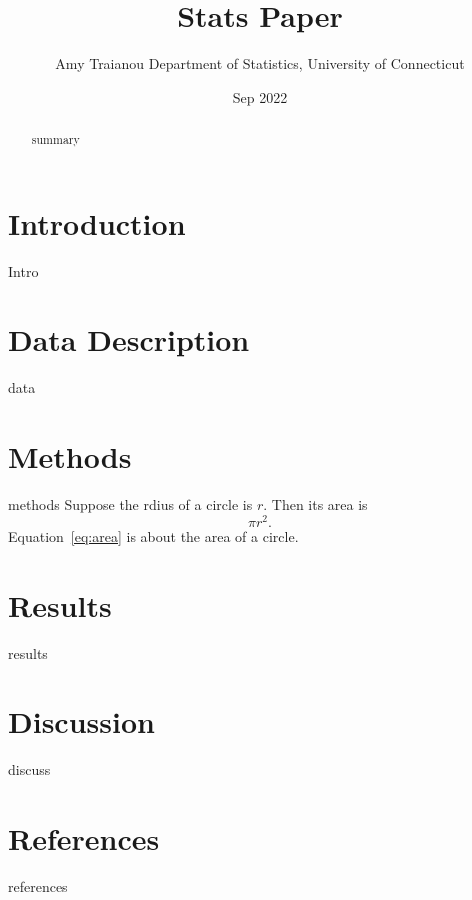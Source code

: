 \documentclass[12pt, letterpaper, titlepage]{article}
\title{Stats Paper}
\author{Amy Traianou
  Department of Statistics, University of Connecticut\\
  }
\date{Sep 2022}
\begin{document}
\maketitle

\begin{abstract}
summary
\end{abstract}

\section*{Introduction}
Intro

\section*{Data Description}
data

\section*{Methods}
methods Suppose the rdius of a circle is $r$. Then its area is 
\begin{equation}
\label{eq:area}
\pi r^2.
\end{equation}
Equation~\eqref{eq:area} is about the area of a circle. 


\section*{Results}
results

\section*{Discussion}
discuss

\section*{References}
references
\end{document}

